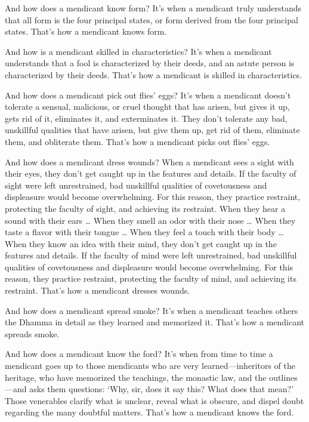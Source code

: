\documentclass[12pt,openany]{book}%
\begin{document}
And how does a mendicant know form? It’s when a mendicant truly understands that all form is the four principal states, or form derived from the four principal states. That’s how a mendicant knows form. 

And how is a mendicant skilled in characteristics? It’s when a mendicant understands that a fool is characterized by their deeds, and an astute person is characterized by their deeds. That’s how a mendicant is skilled in characteristics. 

And how does a mendicant pick out flies’ eggs? It’s when a mendicant doesn’t tolerate a sensual, malicious, or cruel thought that has arisen, but gives it up, gets rid of it, eliminates it, and exterminates it. They don’t tolerate any bad, unskillful qualities that have arisen, but give them up, get rid of them, eliminate them, and obliterate them. That’s how a mendicant picks out flies’ eggs. 

And how does a mendicant dress wounds? When a mendicant sees a sight with their eyes, they don’t get caught up in the features and details. If the faculty of sight were left unrestrained, bad unskillful qualities of covetousness and displeasure would become overwhelming. For this reason, they practice restraint, protecting the faculty of sight, and achieving its restraint. When they hear a sound with their ears … When they smell an odor with their nose … When they taste a flavor with their tongue … When they feel a touch with their body … When they know an idea with their mind, they don’t get caught up in the features and details. If the faculty of mind were left unrestrained, bad unskillful qualities of covetousness and displeasure would become overwhelming. For this reason, they practice restraint, protecting the faculty of mind, and achieving its restraint. That’s how a mendicant dresses wounds. 

And how does a mendicant spread smoke? It’s when a mendicant teaches others the Dhamma in detail as they learned and memorized it. That’s how a mendicant spreads smoke. 

And how does a mendicant know the ford? It’s when from time to time a mendicant goes up to those mendicants who are very learned—inheritors of the heritage, who have memorized the teachings, the monastic law, and the outlines—and asks them questions: ‘Why, sir, does it say this? What does that mean?’ Those venerables clarify what is unclear, reveal what is obscure, and dispel doubt regarding the many doubtful matters. That’s how a mendicant knows the ford. 
\end{document}

